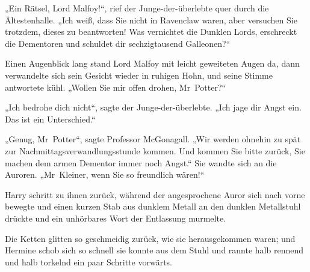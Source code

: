 „Ein Rätsel, Lord Malfoy!“, rief der Junge-der-überlebte quer durch die Ältestenhalle.
„Ich weiß, dass Sie nicht in Ravenclaw waren, aber versuchen Sie trotzdem, dieses zu beantworten! Was vernichtet die Dunklen Lords, erschreckt die Dementoren und schuldet dir sechzigtausend Galleonen?“

Einen Augenblick lang stand Lord Malfoy mit leicht geweiteten Augen da, dann verwandelte sich sein Gesicht wieder in ruhigen Hohn, und seine Stimme antwortete kühl.
„Wollen Sie mir offen drohen, Mr~Potter?“

„Ich bedrohe dich nicht“, sagte der Junge-der-überlebte.
„Ich jage dir Angst ein. Das ist ein Unterschied.“

„Genug, Mr~Potter“, sagte Professor McGonagall.
„Wir werden ohnehin zu spät zur Nachmittagsverwandlungsstunde kommen. Und kommen Sie bitte zurück, Sie machen dem armen Dementor immer noch Angst.“
Sie wandte sich an die Auroren.
„Mr~Kleiner, wenn Sie so freundlich wären!“

Harry schritt zu ihnen zurück, während der angesprochene Auror sich nach vorne bewegte und einen kurzen Stab aus dunklem Metall an den dunklen Metallstuhl drückte und ein unhörbares Wort der Entlassung murmelte.

Die Ketten glitten so geschmeidig zurück, wie sie herausgekommen waren; und Hermine schob sich so schnell sie konnte aus dem Stuhl und rannte halb rennend und halb torkelnd ein paar Schritte vorwärts.

